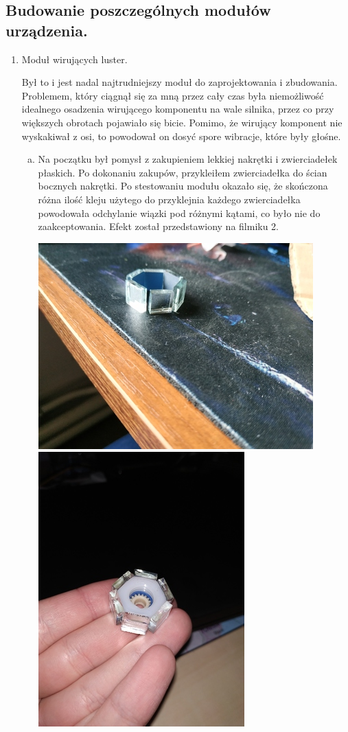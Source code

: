 \documentclass[a4paper,oneside,11pt]{report}
\begin{document}
\subsection{Budowanie poszczególnych modułów urządzenia.}
\begin{enumerate}[1.]
\item Moduł wirujących luster.

Był to i jest nadal najtrudniejszy moduł do zaprojektowania i zbudowania. Problemem, który ciągnął się za mną przez cały czas była niemożliwość idealnego osadzenia wirującego komponentu na wale silnika, przez co przy większych obrotach pojawiało się bicie. Pomimo, że wirujący komponent nie wyskakiwał z osi, to powodował on dosyć spore wibracje, które były głośne.
\begin{enumerate}[a)]
\item Na początku był pomysł z zakupieniem lekkiej nakrętki i zwierciadełek płaskich. Po dokonaniu zakupów, przykleiłem zwierciadełka do ścian bocznych nakrętki. Po stestowaniu modułu okazało się, że skończona różna ilość kleju użytego do przyklejnia każdego zwierciadełka powodowała odchylanie wiązki pod różnymi kątami, co było nie do zaakceptowania. Efekt został przedstawiony na filmiku 2.

\includegraphics[scale=0.5]{images/3.jpg} 
\includegraphics[scale=0.5]{images/4.jpg} 


\end{enumerate}
\end{enumerate}
\end{document}
